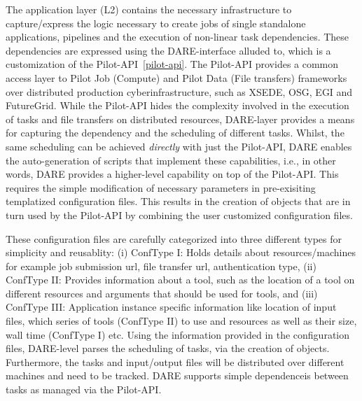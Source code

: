 \documentclass[]{svjour3}
\begin{document}
The application layer (L2) contains the necessary infrastructure to
capture/express the logic necessary to create jobs of single
standalone applications, pipelines and the execution of non-linear
task dependencies.  These dependencies are expressed using the
DARE-interface alluded to, which is a customization of the
Pilot-API~\ref{pilot-api}. The Pilot-API provides a common access
layer to Pilot Job (Compute) and Pilot Data (File transfers)
frameworks over distributed production cyberinfrastructure, such as
XSEDE, OSG, EGI and FutureGrid.  While the Pilot-API hides the
complexity involved in the execution of tasks and file transfers on
distributed resources, DARE-layer provides a means for capturing the
dependency and the scheduling of different tasks.  Whilst, the same
scheduling can be achieved {\it directly} with just the Pilot-API,
DARE enables the auto-generation of scripts that implement these
capabilities, i.e., in other words, DARE provides a higher-level
capability on top of the Pilot-API.  This requires the simple
modification of necessary parameters in pre-exisiting templatized
configuration files.  This results in the creation of objects that are
in turn used by the Pilot-API by combining the user customized
configuration files.

These configuration files are carefully categorized into three
different types for simplicity and reusablity: (i) ConfType I: Holds
details about resources/machines for example job submission url, file
transfer url, authentication type, (ii) ConfType II: Provides
information about a tool, such as the location of a tool on different
resources and arguments that should be used for tools, and (iii)
ConfType III: Application instance specific information like location
of input files, which series of tools (ConfType II) to use and
resources as well as their size, wall time (ConfType I) etc.  Using
the information provided in the configuration files, DARE-level parses
the scheduling of tasks, via the creation of objects.  Furthermore,
the tasks and input/output files will be distributed over different
machines and need to be tracked.  DARE supports simple dependenceis
between tasks as managed via the Pilot-API.



\end{document}
